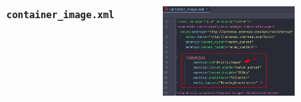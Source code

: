 \documentclass{beamer}
\begin{document}
\begin{frame}
\begin{columns}
\begin{figure}
        \end{figure}
        \indent \textbf{\texttt{container\_image.xml}}
        \begin{figure}
            \centering
            \includegraphics[width=\textwidth]{images/15.png}
        \end{figure}
    \end{columns}
\end{frame}
\end{document}

